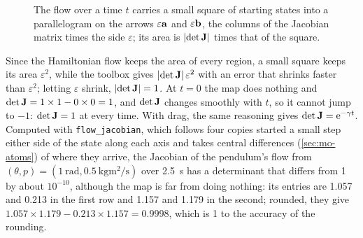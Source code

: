 \begin{figure}[htb]
\centering
{}
\caption{The flow over a time $t$ carries a small square of starting
states into a parallelogram on the arrows $\varepsilon\bm{\mathrm{a}}$ and
$\varepsilon\bm{\mathrm{b}}$, the columns of the Jacobian matrix times the side
$\varepsilon$; its area is $\lvert\det\bm{\mathrm{J}}\rvert$ times that of the
square.}
\label{fig:ha-square}
\end{figure}

Since the Hamiltonian flow keeps the area of every region, a small square
keeps its area $\varepsilon^2$, while the toolbox gives $\lvert\det\bm{\mathrm{J}}
\rvert\,\varepsilon^2$ with an error that shrinks faster than
$\varepsilon^2$; letting $\varepsilon$ shrink, $\lvert\det\bm{\mathrm{J}}\rvert =
1$. At $t = 0$ the map does nothing and $\det\bm{\mathrm{J}} = 1\times1 - 0\times0
= 1$, and $\det\bm{\mathrm{J}}$ changes smoothly with $t$, so it cannot jump to
$-1$: $\det\bm{\mathrm{J}} = 1$ at every time. With drag, the same reasoning gives
$\det\bm{\mathrm{J}} = \mathrm{e}^{-\gamma t}$. Computed with
\texttt{flow\_jacobian}, which follows four copies started a small step
either side of the state along each axis and takes central differences
(\cref{sec:mo-atoms}) of where they arrive, the Jacobian of the pendulum's flow from
$(\theta, p) = (\SI{1}{\radian}, \SI{0.5}{\kilogram\metre\squared\per
\second})$ over \SI{2.5}{\second} has a determinant that differs from 1 by
about
$10^{-10}$, although the map is far from doing nothing: its entries are
1.057 and 0.213 in the first row and 1.157 and 1.179 in the second;
rounded, they give $1.057\times1.179 - 0.213\times1.157 = 0.9998$, which is
1 to the accuracy of the rounding.

